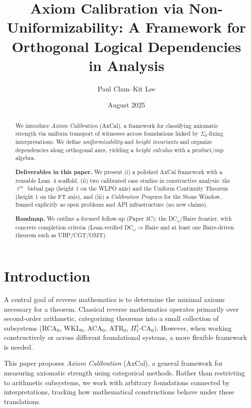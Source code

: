 \documentclass[11pt]{article}
\title{Axiom Calibration via Non-Uniformizability: A Framework for Orthogonal Logical Dependencies in Analysis}
\author{Paul Chun--Kit Lee}
\date{August 2025}
\newcommand{\SigmaZero}{\Sigma_{0}}
\begin{document}
\maketitle

\begin{abstract}
We introduce \emph{Axiom Calibration} (AxCal), a framework for classifying axiomatic strength via uniform transport of witnesses across foundations linked by $\SigmaZero$-fixing interpretations. We define \emph{uniformizability} and \emph{height invariants} and organize dependencies along orthogonal axes, yielding a \emph{height calculus} with a product/sup algebra.

\smallskip
\noindent \textbf{Deliverables in this paper.} We present (i) a polished AxCal framework with a reusable Lean~4 scaffold, (ii) two calibrated case studies in constructive analysis: the $\ell^\infty$ bidual gap (height $1$ on the WLPO axis) and the Uniform Continuity Theorem (height $1$ on the FT axis), and (iii) a \emph{Calibration Program} for the Stone Window, framed explicitly as open problems and API infrastructure (no new claims).

\smallskip
\noindent \textbf{Roadmap.} We outline a focused follow-up (Paper 3C): the DC$_\omega$/Baire frontier, with concrete completion criteria (Lean-verified DC$_\omega\Rightarrow$Baire and at least one Baire-driven theorem such as UBP/CGT/OMT).
\end{abstract}

\tableofcontents

\section{Introduction}

A central goal of reverse mathematics is to determine the minimal axioms necessary for a theorem. Classical reverse mathematics operates primarily over second-order arithmetic, categorizing theorems into a small collection of subsystems (RCA$_0$, WKL$_0$, ACA$_0$, ATR$_0$, $\Pi^1_1$-CA$_0$). However, when working constructively or across different foundational systems, a more flexible framework is needed.

This paper proposes \emph{Axiom Calibration} (AxCal), a general framework for measuring axiomatic strength using categorical methods. Rather than restricting to arithmetic subsystems, we work with arbitrary foundations connected by interpretations, tracking how mathematical constructions behave under these translations.
\end{document}
